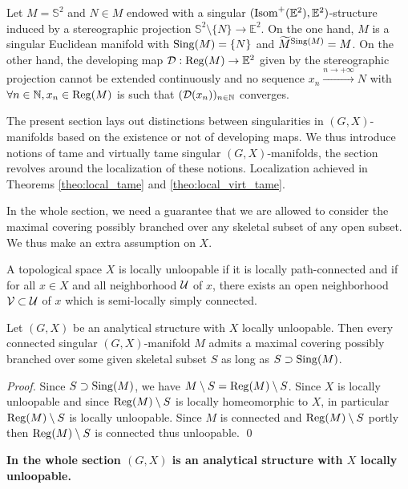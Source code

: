 \begin{ex}\label{ex:eucl_sphere} Let $M = \mathbb S^2$  and $N\in M$ endowed with a singular $(\mathrm{Isom}^+(\mathbb{E}^2),\mathbb E^2)$-structure induced by a stereographic projection $\mathbb S^2\setminus \{N\} \rightarrow \mathbb E^2$. 
On the one hand, $M$ is a singular Euclidean manifold with $\mathrm{Sing}(M)=\{N\}$ and  $\widetilde M^{\mathrm{Sing}(M)} = M$. On the other hand, the  developing map $\mathcal{D}:\mathrm{Reg}(M)\rightarrow \mathbb E^2$ given by  the stereographic projection  cannot be extended continuously and no sequence $x_n\xrightarrow{n\rightarrow +\infty} N$ with $\forall n\in\mathbb{N}, x_n\in \mathrm{Reg}(M)$ is such that $(\mathcal{D}(x_n))_{n\in \mathbb{N}}$ converges.
\end{ex}

The present section lays out distinctions between singularities in $(G,X)$-manifolds based on the existence or not of developing maps. We thus introduce notions of tame and virtually tame singular $(G,X)$-manifolds, the section revolves around the localization
of these notions. Localization achieved in Theorems \ref{theo:local_tame} and \ref{theo:local_virt_tame}.



In the whole section, we need a guarantee that we are allowed to consider the maximal covering possibly branched over any skeletal subset of any open subset. We thus make an extra assumption on $X$.
\begin{defi} A topological space $X$ is locally unloopable if it is locally path-connected and if for all 
$x\in X$ and all neighborhood $\mathcal{U}$ of $x$, there exists an open neighborhood $\mathcal V\subset \mathcal{U}$ of $x$ which is semi-locally simply connected.
\end{defi}
\begin{lem} Let $(G,X)$ be an analytical structure with $X$ locally unloopable.  Then every connected singular $(G,X)$-manifold $M$ admits a maximal covering possibly branched over some given skeletal subset $S$ as long as $S\supset \mathrm{Sing}(M)$.
\end{lem}
\begin{proof} Since $S\supset \mathrm{Sing}(M)$, we have
 $M\setminus S = \mathrm{Reg}(M)\setminus S$. Since $X$ is locally unloopable and since $\mathrm{Reg}(M)\setminus S$ is locally homeomorphic to $X$, in particular $\mathrm{Reg}(M)\setminus S$ is locally unloopable. Since $M$ is connected and $\mathrm{Reg}(M)\setminus S$ portly then $\mathrm{Reg}(M)\setminus S$ is connected thus unloopable. 
\qed\end{proof}

\textbf{
In the whole section $(G,X)$ is an analytical structure with $X$ locally unloopable.}



